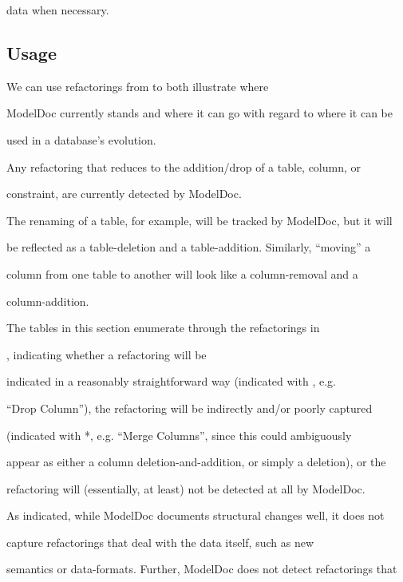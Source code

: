 \documentclass{acm_proc_article-sp}
\begin{document}
data when necessary.



\subsection{Usage}



We can use refactorings from \cite{ambler:refactoring} to both illustrate where

ModelDoc currently stands and where it can go with regard to where it can be

used in a database's evolution.



Any refactoring that reduces to the addition/drop of a table, column, or

constraint, are currently detected by ModelDoc.



The renaming of a table, for example, will be tracked by ModelDoc, but it will

be reflected as a table-deletion and a table-addition.  Similarly, ``moving'' a

column from one table to another will look like a column-removal and a

column-addition.



The tables in this section enumerate through the refactorings in

\cite{ambler:refactoring}, indicating whether a refactoring will be

indicated in a reasonably straightforward way (indicated with \checkmark, e.g.

``Drop Column''), the refactoring will be indirectly and/or poorly captured

(indicated with *, e.g. ``Merge Columns'', since this could ambiguously

appear as either a column deletion-and-addition, or simply a deletion), or the

refactoring will (essentially, at least) not be detected at all by ModelDoc.



As indicated, while ModelDoc documents structural changes well, it does not

capture refactorings that deal with the data itself, such as new

semantics or data-formats. Further, ModelDoc does not detect refactorings that
\end{document}
